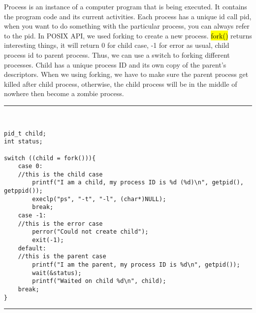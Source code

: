 \documentclass[letterpaper,12pt,titlepage]{article}
\begin{document}
Process is an instance of a computer program that is being executed. It contains the program code and its current activities. Each process has a unique id call pid, when you want to do something with the particular process, you can always refer to the pid. In POSIX API, we used forking to create a new process. \hl{fork()} returns interesting things, it will return 0 for child case, -1 for error as usual, child process id to parent process. Thus, we can use a switch to forking different processes. Child has a unique process ID and its own copy of the parent's descriptors. When we using forking, we have to make sure the parent process get killed after child process, otherwise, the child process will be in the middle of nowhere then become a zombie process.\par
\noindent\rule{15.5cm}{0.4pt}
\\
\begin{verbatim}
pid_t child; 
int status; 
	 
switch ((child = fork())){ 
    case 0: 
    //this is the child case 
        printf("I am a child, my process ID is %d (%d)\n", getpid(), getppid()); 
        execlp("ps", "-t", "-l", (char*)NULL); 
        break; 
    case -1: 
    //this is the error case 
        perror("Could not create child"); 
        exit(-1); 
    default: 
    //this is the parent case 
        printf("I am the parent, my process ID is %d\n", getpid()); 
        wait(&status); 
        printf("Waited on child %d\n", child); 
    break; 
} 
\end{verbatim}
\noindent\rule{15.5cm}{0.4pt}\\
\end{document}
